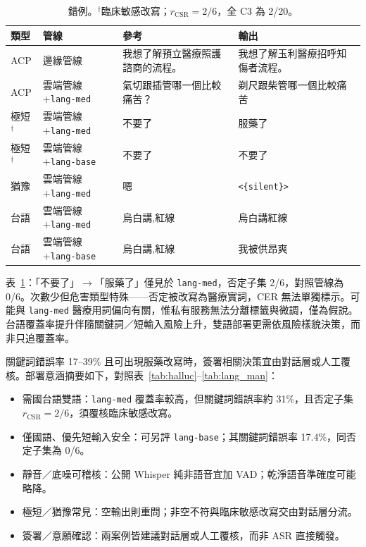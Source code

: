 \documentclass[11pt,a4paper]{article}
\newcommand{\CloudASR}{雲端管線}
\newcommand{\EdgeASR}{邊緣管線}
\newcommand{\LangMVOne}{\texttt{lang-med}}
\newcommand{\LangLegacy}{\texttt{lang-base}}
\begin{document}
\begin{table}[!t]
\centering
\footnotesize
\setlength{\tabcolsep}{4pt}
\renewcommand{\arraystretch}{1.1}
\begin{tabular}{@{}%
  >{\raggedright\arraybackslash}p{}%
  >{\raggedright\arraybackslash}p{}%
  >{\raggedright\arraybackslash}p{}%
  >{\raggedright\arraybackslash}p{}%
@{}}
\toprule
\textbf{類型} & \textbf{管線} & \textbf{參考} & \textbf{輸出} \\
\midrule
ACP & \EdgeASR{} & 我想了解預立醫療照護諮商的流程。 & 我想了解玉利醫療招呼知傷者流程。 \\
ACP & \CloudASR{}+\LangMVOne{} & 氣切跟插管哪一個比較痛苦？ & 剃尺跟柴管哪一個比較痛苦 \\
\addlinespace
極短$^\dagger$ & \CloudASR{}+\LangMVOne{} & 不要了 & 服藥了 \\
極短$^\dagger$ & \CloudASR{}+\LangLegacy{} & 不要了 & 不要了 \\
\addlinespace
猶豫 & \CloudASR{}+\LangMVOne{} & 嗯 & \texttt{<\{silent\}>} \\
\addlinespace
台語 & \CloudASR{}+\LangMVOne{} & 烏白講,紅線 & 烏白講紅線 \\
台語 & \CloudASR{}+\LangLegacy{} & 烏白講,紅線 & 我被供昂爽 \\
\bottomrule
\end{tabular}
\caption{\label{tab:errors} 錯例。$^\dagger$臨床敏感改寫；$r_{\mathrm{CSR}}{=}2/6$，全 C3 為 2/20。}
\end{table}

表~\ref{tab:errors}：「不要了」$\rightarrow$「服藥了」僅見於 \LangMVOne{}，否定子集 2/6，對照管線為 0/6。次數少但危害類型特殊——否定被改寫為醫療實詞，CER 無法單獨標示。可能與 \texttt{lang-med} 醫療用詞偏向有關，惟私有服務無法分離標籤與微調，僅為假說。台語覆蓋率提升伴隨關鍵詞／短輸入風險上升，雙語部署更需依風險樣貌決策，而非只追覆蓋率。

關鍵詞錯誤率 17--39\% 且可出現服藥改寫時，簽署相關決策宜由對話層或人工覆核。部署意涵摘要如下，對照表~\ref{tab:halluc}--\ref{tab:lang_man}：
\begin{itemize}
  \item 需國台語雙語：\LangMVOne{} 覆蓋率較高，但關鍵詞錯誤率約 31\%，且否定子集 $r_{\mathrm{CSR}}{=}2/6$，須覆核臨床敏感改寫。
  \item 僅國語、優先短輸入安全：可另評 \LangLegacy{}；其關鍵詞錯誤率 17.4\%，同否定子集為 0/6。
  \item 靜音／底噪可稽核：公開 Whisper 純非語音宜加 VAD；乾淨語音準確度可能略降。
  \item 極短／猶豫常見：空輸出則重問；非空不符與臨床敏感改寫交由對話層分流。
  \item 簽署／意願確認：兩案例皆建議對話層或人工覆核，而非 ASR 直接觸發。
\end{itemize}
\end{document}
